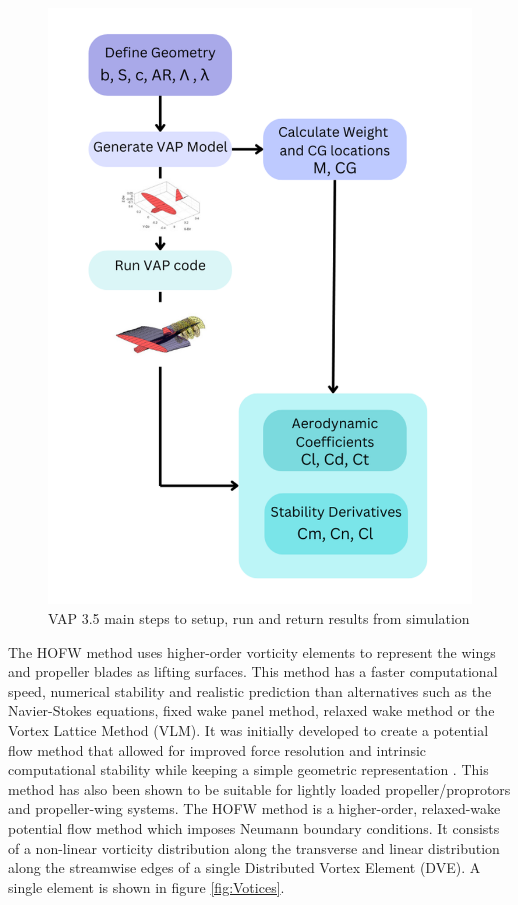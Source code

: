  
 \begin{figure}[!ht]
 \centering
 \includegraphics[scale=0.6]{04_Methodology/Figs/jasmine.png}
 \caption{VAP 3.5 main steps to setup, run and return results from simulation}
 \label{fig:flowchart}
 \end{figure}



The \acrshort{HOFW} method uses higher-order vorticity elements to represent the wings and propeller blades as lifting surfaces. This method has a faster computational speed, numerical stability and realistic prediction than alternatives such as the Navier-Stokes equations, fixed wake panel method, relaxed wake method or the Vortex Lattice Method (\acrshort{VLM}). It was initially developed to create a potential flow method that allowed for improved force resolution and intrinsic computational stability while keeping a simple geometric representation \cite{Cole2019}. This method has also been shown to be suitable for lightly loaded propeller/proprotors and propeller-wing systems. The \acrshort{HOFW} method is a higher-order, relaxed-wake potential flow method which imposes Neumann boundary conditions. It consists of a non-linear vorticity distribution along the transverse and linear distribution along the streamwise edges of a single Distributed Vortex Element (\acrshort{DVE}). A single element is shown in figure \ref{fig:Votices}. 

